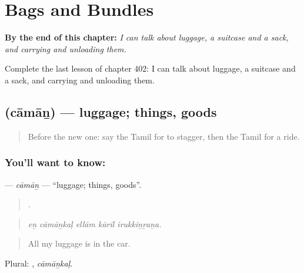 
\chapter{Bags and Bundles}
\label{ch:ta-bags-and-bundles}

\begin{chapteropening}
\textbf{By the end of this chapter:} \emph{I can talk about luggage, a suitcase and a sack, and carrying and unloading them.}

Complete the last lesson of chapter 402: I can talk about luggage, a suitcase and a sack, and carrying and unloading them.
\end{chapteropening}

\section[\texorpdfstring{\ta{சாமான்} (cāmāṉ)}{சாமான் (cāmāṉ)}]{ (cāmāṉ) — luggage; things, goods}

\label{lesson:TA-C402-caman}



\begin{quote}
Before the new one: say the Tamil for to stagger, then the Tamil for a ride.
\end{quote}

\subsection*{You'll want to know: }
\textbf{} — \emph{cāmāṉ} — \textquotedblleft{}luggage; things, goods\textquotedblright{}.

\begin{quote}
    .
\end{quote}

\begin{quote}
\emph{eṉ cāmāṉkaḷ ellām kāril irukkiṉṟaṉa.}
\end{quote}

\begin{quote}
All my luggage is in the car.
\end{quote}

Plural: , \emph{cāmāṉkaḷ}.

